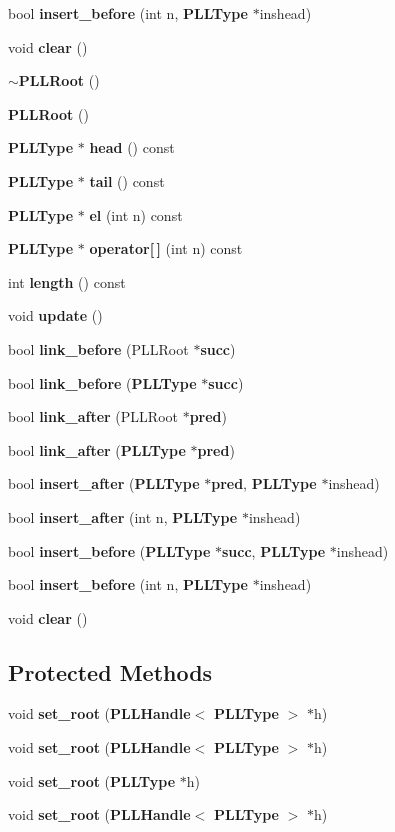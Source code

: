 \begin{CompactItemize}
\item 
bool {\bf insert\_\-before} (int n, {\bf PLLType} $\ast$inshead)
\item 
void {\bf clear} ()
\item 
{\bf $\sim$PLLRoot} ()
\item 
{\bf PLLRoot} ()
\item 
{\bf PLLType} $\ast$ {\bf head} () const
\item 
{\bf PLLType} $\ast$ {\bf tail} () const
\item 
{\bf PLLType} $\ast$ {\bf el} (int n) const
\item 
{\bf PLLType} $\ast$ {\bf operator[$\,$]} (int n) const
\item 
int {\bf length} () const
\item 
void {\bf update} ()
\item 
bool {\bf link\_\-before} (PLLRoot $\ast${\bf succ})
\item 
bool {\bf link\_\-before} ({\bf PLLType} $\ast${\bf succ})
\item 
bool {\bf link\_\-after} (PLLRoot $\ast${\bf pred})
\item 
bool {\bf link\_\-after} ({\bf PLLType} $\ast${\bf pred})
\item 
bool {\bf insert\_\-after} ({\bf PLLType} $\ast${\bf pred}, {\bf PLLType} $\ast$inshead)
\item 
bool {\bf insert\_\-after} (int n, {\bf PLLType} $\ast$inshead)
\item 
bool {\bf insert\_\-before} ({\bf PLLType} $\ast${\bf succ}, {\bf PLLType} $\ast$inshead)
\item 
bool {\bf insert\_\-before} (int n, {\bf PLLType} $\ast$inshead)
\item 
void {\bf clear} ()
\end{CompactItemize}
\subsection*{Protected Methods}
\begin{CompactItemize}
\item 
void {\bf set\_\-root} ({\bf PLLHandle}$<$ {\bf PLLType} $>$ $\ast$h)
\item 
void {\bf set\_\-root} ({\bf PLLHandle}$<$ {\bf PLLType} $>$ $\ast$h)
\item 
void {\bf set\_\-root} ({\bf PLLType} $\ast$h)
\item 
void {\bf set\_\-root} ({\bf PLLHandle}$<$ {\bf PLLType} $>$ $\ast$h)
\end{CompactItemize}
